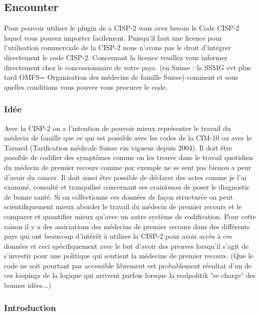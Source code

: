 \subsection{Encounter}
Pour pouvoir utiliser le plugin de a CISP-2 vous avez besoin le Code CISP-2 lequel vous pouvez importer facilement. Puisqu'il faut une licence pour l'utilisation commerciale de la CISP-2 nous n'avons pas le droit d'intégrer directement le code CISP-2. Concernant la licence veuillez vous informer directement chez le concessionnaire de votre pays. (en Suisse : la SSMG evt plus tard OMFS= Organisation des médecins de famille Suisse) comment et sous quelles conditions vous pouvez vous procurer le code.
\subsubsection{Idée}
Avec la CISP-2 on a l'intention de pouvoir mieux représenter le travail du médecin de famille que ce qui est possible avec les codes de la CIM-10 ou avec le Tarmed (Tarification médicale Suisse ein vigueur depuis 2004). Il doit être possible de codifier des symptômes comme on les trouve dans le travail quotidien du médecin de premier recours comme par exemple \glqq ne se sent pas bien\grqq ou \glqq a peur d'avoir du cancer\grqq. Il doit aussi être possible de déclarer des actes comme \glqq je l'ai examiné, consulté et tranquilisé concernant ses craintes\grqq ou de poser le diagnostic  \glqq de bonne santé\grqq. Si on collectionne ces données de façon structurée on peut scientifiquement mieux aborder le travail du médecin de premier recours et le comparer et quantifier mieux qu'avec un autre système de codification. Pour cette raison il y a des assiciations des médecins de premier recours dans des différents pays qui ont beaucoup d'intérêt à utiliser la CISP-2 pour avoir accès à ces données et ceci spécifiquement avec le but d'avoir des preuves lorsqu'il s'agit de s'investir pour une politique qui soutient la médecine de premier recours. (Que le code ne soit pourtant pas accessible librement est probablement résultat d'un de ces loopings de la logique qui arrivent parfois lorsque la realpolitik "se charge" des bonnes idées...)
\subsubsection{Introduction}


